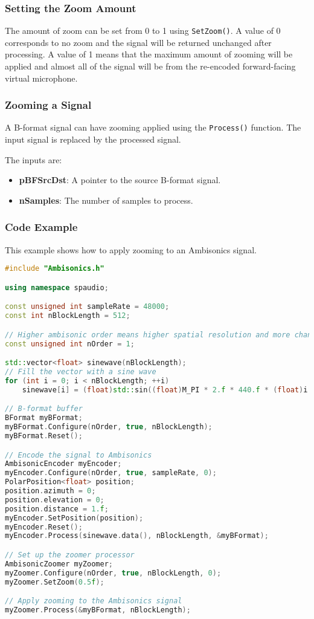 \documentclass[12pt]{report}
\newcommand{\code}[1]{\texttt{#1}}
\begin{document}
\subsubsection{Setting the Zoom Amount}

The amount of zoom can be set from 0 to 1 using \code{SetZoom()}. A value of 0 corresponds to no zoom and the signal will be returned unchanged after processing.
A value of 1 means that the maximum amount of zooming will be applied and almost all of the signal will be from the re-encoded forward-facing virtual microphone.

\subsubsection{Zooming a Signal}

A B-format signal can have zooming applied using the \code{Process()} function. The input signal is replaced by the processed signal.

The inputs are:
\begin{itemize}
    \item \textbf{pBFSrcDst}: A pointer to the source B-format signal.
    \item \textbf{nSamples}: The number of samples to process.
\end{itemize}

\subsubsection{Code Example}

This example shows how to apply zooming to an Ambisonics signal.

\begin{lstlisting}[language=C++]
#include "Ambisonics.h"

using namespace spaudio;

const unsigned int sampleRate = 48000;
const int nBlockLength = 512;

// Higher ambisonic order means higher spatial resolution and more channels required
const unsigned int nOrder = 1;

std::vector<float> sinewave(nBlockLength);
// Fill the vector with a sine wave
for (int i = 0; i < nBlockLength; ++i)
    sinewave[i] = (float)std::sin((float)M_PI * 2.f * 440.f * (float)i / (float)sampleRate);

// B-format buffer
BFormat myBFormat;
myBFormat.Configure(nOrder, true, nBlockLength);
myBFormat.Reset();

// Encode the signal to Ambisonics
AmbisonicEncoder myEncoder;
myEncoder.Configure(nOrder, true, sampleRate, 0);
PolarPosition<float> position;
position.azimuth = 0;
position.elevation = 0;
position.distance = 1.f;
myEncoder.SetPosition(position);
myEncoder.Reset();
myEncoder.Process(sinewave.data(), nBlockLength, &myBFormat);

// Set up the zoomer processor
AmbisonicZoomer myZoomer;
myZoomer.Configure(nOrder, true, nBlockLength, 0);
myZoomer.SetZoom(0.5f);

// Apply zooming to the Ambisonics signal
myZoomer.Process(&myBFormat, nBlockLength);
\end{lstlisting}
\end{document}
